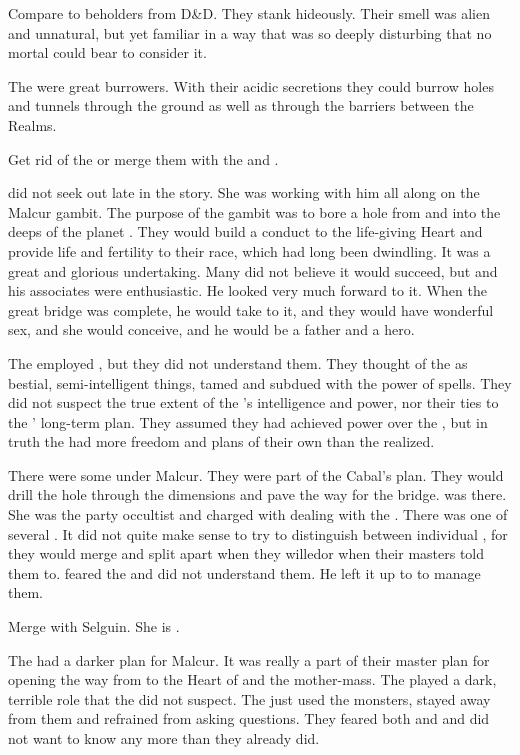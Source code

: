 Compare \noggyaleth to beholders from D&D.
They stank hideously.
Their smell was alien and unnatural, but yet familiar in a way that was so deeply disturbing that no mortal could bear to consider it.

The \noggyaleth were great burrowers.
With their acidic secretions they could burrow holes and tunnels through the ground as well as through the barriers between the Realms.

Get rid of the  or merge them with the \noggyaleth and \xss.

\Teshrial did not seek out \Urizeth late in the story.
She was working with him all along on the Malcur gambit.
The purpose of the gambit was to bore a hole from \Nyx and into the deeps of the planet \Miith.
They would build a conduct to the life-giving Heart and provide life and fertility to their race, which had long been dwindling.
It was a great and glorious undertaking.
Many did not believe it would succeed, but \Teshrial and his associates were enthusiastic.
He looked very much forward to it.
When the great bridge was complete, he would take \Firaxel to it, and they would have wonderful sex, and she would conceive, and he would be a father and a hero.

The \resphain employed \noggyaleth, but they did not understand them.
They thought of the \noggyaleth as bestial, semi-intelligent things, tamed and subdued with the power of spells.
They did not suspect the true extent of the \noggyaleth's intelligence and power, nor their ties to the \banelords' long-term plan.
They assumed they had achieved power over the \noggyaleth, but in truth the \noggyaleth had more freedom and plans of their own than the \resphain realized.

There were some \noggyaleth under Malcur.
They were part of the Cabal's plan.
They would drill the hole through the dimensions and pave the way for the bridge.
\Urizeth was there.
She was the party occultist and charged with dealing with the \noggyaleth.
There was one of several \noggyaleth.
It did not quite make sense to try to distinguish between individual \noggyaleth, for they would merge and split apart when they willed\dash{}or when their masters told them to.
\Teshrial feared the \noggyaleth and did not understand them.
He left it up to \Urizeth to manage them.

Merge \Urizeth with Selguin.
She is \CiriathSepher.

The \banes had a darker plan for Malcur.
It was really a part of their master plan for opening the way from \Erebos to the Heart of \Miith and the \noggyal mother-mass.
The \noggyaleth played a dark, terrible role that the \resphain did not suspect.
The \resphain just used the monsters, stayed away from them and refrained from asking questions.
They feared both \noggyaleth and \banes and did not want to know any more than they already did.

